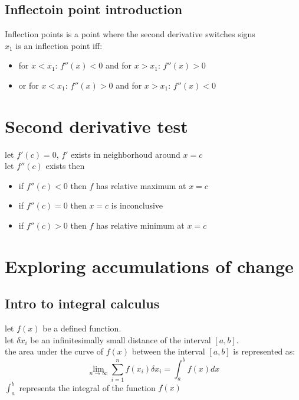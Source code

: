 \documentclass{article}
\begin{document}
        \subsection{Inflectoin point introduction}
            Inflection points is a point where the second derivative switches signs \\
            \(x_1\) is an inflection point iff: 
            \begin{itemize}
                \item for \(x < x_1 \): \(f''(x) < 0\) and for \(x > x_1\): \(f''(x) > 0\)
                \item or for \(x < x_1 \): \(f''(x) > 0\) and for \(x > x_1\): \(f''(x) < 0\) 
            \end{itemize}
\section{Second derivative test}
            let \(f'(c) = 0\), \(f'\) exists in neighborhoud around \( x = c\) \\ 
            let \(f''(c)\) exists then \\
            \begin{itemize}
                \item if \(f''(c) < 0\) then \(f\) has  relative maximum at \(x = c\)
                \item if \(f''(c) = 0\) then \(x = c\) is inconclusive 
                \item if \(f''(c) > 0\) then \(f\) has  relative minimum at \(x = c\)
            \end{itemize}
            
\section{Exploring accumulations of change }
        \subsection{Intro to integral calculus}
            let \(f(x)\)  be a  defined function.\\ 
            let \(\delta x_i\) be an infinitesimally small distance of the interval \([a, b]\). \\ 
            the area under the curve of \(f(x)\) between the interval \([a, b]\)
            is represented as: 
                \[\lim_{n \to \infty } \sum_{i=1}^{n} f(x_i) \delta x_i = \int_{a}^{b} f(x)dx\] 
            \(\int_{a}^{b}\) represents the integral of the function \(f(x)\)
\end{document}

